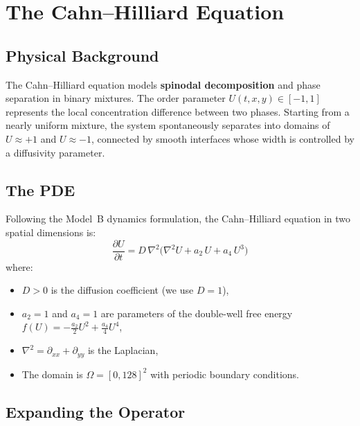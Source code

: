\documentclass[11pt,a4paper]{article}
\begin{document}
\section{The Cahn--Hilliard Equation}
\label{sec:ch}

\subsection{Physical Background}

The Cahn--Hilliard equation models \textbf{spinodal decomposition} and
phase separation in binary mixtures.  The order parameter $U(t, x, y)
\in [-1, 1]$ represents the local concentration difference between two
phases.  Starting from a nearly uniform mixture, the system spontaneously
separates into domains of $U \approx +1$ and $U \approx -1$, connected
by smooth interfaces whose width is controlled by a diffusivity parameter.

\subsection{The PDE}

Following the Model~B dynamics formulation, the Cahn--Hilliard equation
in two spatial dimensions is:
\begin{equation}
\boxed{
  \frac{\partial U}{\partial t}
  = D \,\nabla^{2}\!\Big(
      \nabla^{2} U + a_2\, U + a_4\, U^3
    \Big)
}
\label{eq:ch}
\end{equation}
where:
\begin{itemize}[nosep]
  \item $D > 0$ is the diffusion coefficient (we use $D = 1$),
  \item $a_2 = 1$ and $a_4 = 1$ are parameters of the double-well free energy
        $f(U) = -\tfrac{a_2}{2} U^2 + \tfrac{a_4}{4} U^4$,
  \item $\nabla^2 = \partial_{xx} + \partial_{yy}$ is the Laplacian,
  \item The domain is $\Omega = [0, 128]^2$ with periodic boundary conditions.
\end{itemize}

\subsection{Expanding the Operator}
\end{document}
